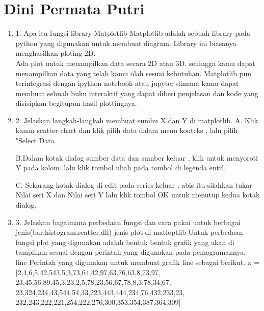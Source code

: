 \section{Dini Permata Putri}
\begin{enumerate}


\item 1. Apa itu fungsi library Matplotlib
Matplotlib adalah sebuah library pada python yang digunakan untuk membuat diagram. Library ini biasanya menghasilkan ploting 2D.\\

Ada plot untuk menampilkan data secara 2D atau 3D. sehingga kamu dapat menampilkan data yang telah kamu olah sesuai kebutuhan. Matplotlib pun terintegrasi dengan ipython notebook atau jupyter dimana kamu dapat membuat sebuah buku interaktif yang dapat diberi penjelasan dan kode yang disisipkan begitupun hasil plottingnya.\\

\item 2. Jelaskan langkah-langkah membuat sumbu X dan Y di matplotlib.
A. Klik kanan scatter chart dan klik pilih data dalam menu konteks , lalu pilih "Select Data

B.Dalam kotak dialog sumber data dan sumber keluar , klik untuk menyoroti Y pada kolom. lalu klik tombol ubah pada tombol di legenda entrl.

C. Sekarang kotak dialog di edit pada series keluar , abis itu silahkan tukar Nilai seri X dan Nilai seri Y lalu klik tombol OK untuk menutup kedua kotak dialog.\\

\item 3. Jelaskan bagaimana perbedaan fungsi dan cara pakai untuk berbagai jenis(bar,histogram,scatter.dll) jenis plot di matloptlib
Untuk perbedaan fungsi plot yang digunakan adalah bentuk bentuk grafik yang akan di tampilkan sesuai dengan perintah yang digunakan pada pemogramannya.\\

line
    Perintah yang digunakan untuk membuat grafik line sebagai berikut.
x = [2,4,6,5,42,543,5,3,73,64,42,97,63,76,63,8,73,97,\\
23,45,56,89,45,3,23,2,5,78,23,56,67,78,8,3,78,34,67,\\
23,324,234,43,544,54,33,223,443,444,234,76,432,233,23,\\
232,243,222,221,254,222,276,300,353,354,387,364,309]\\




\end{enumerate}
